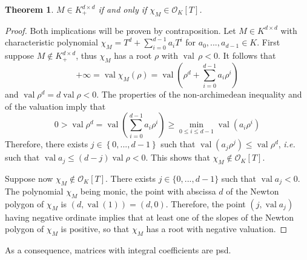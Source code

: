 \documentclass[sigconf]{acmart}
\newtheorem{theorem}{Theorem}[section]
\DeclareMathOperator{\val}{val}
\newcommand{\OK}{\mathcal{O}_K}
\begin{document}
\begin{theorem}
  \label{caracsdp}
  $M \in K^{d\times d}_+$ if and only if $\chi_M \in \OK[T]$.
\end{theorem}
\begin{proof}
  Both implications will be proven by contraposition.
  Let $M \in K^{d\times d}$ with characteristic polynomial $\chi_M = T^d + \sum_{i=0}^{d-1} a_i T^i$ for $a_0,...,a_{d-1} \in K$.
  First suppose $M \not \in K^{d\times d}_+$, thus $\chi_M$ has a root $\rho$ with $\val\,\rho<0$.
  It follows that
  $$
  + \infty = \val \chi_M (\rho) = \val \left(\rho^d+ \sum_{i=0}^{d-1} a_i \rho^i\right)
  $$ and $\val \rho^d = d \val \rho <0$.
  The properties of the non-archimedean inequality and of the valuation imply that
  $$
  0> \val \rho^d = \val\left(\sum_{i=0}^{d-1} a_i \rho^i\right) \geq
  \min_{0 \leq i \leq d-1} \val \left(a_i \rho^i\right)
  $$
  Therefore, there exists $j \in \left\{0,...,d-1\right\}$ such that $\val(a_j \rho^j) \le \val\rho^d$,
  {\it i.e.} such that $\val a_j \le (d-j) \val \rho <0$. This shows that $\chi_M \not\in \OK[T]$.
  

  Suppose now $\chi_M \not\in \OK[T]$. There exists $j \in \{0,...,d-1\}$ such that $\val a_j <0$.
  The polynomial $\chi_M$ being monic, the point with abscissa $d$ of the Newton polygon of $\chi_M$ is
  $(d,\val(1)) = (d,0)$. 
  Therefore, the point $(j, \val a_j)$ having negative ordinate implies that at least one of the slopes of
  the Newton polygon of $\chi_M$ is positive, so that $\chi_M$ has a root with negative valuation.
\end{proof}

As a consequence, matrices with integral coefficients are psd.
\end{document}
